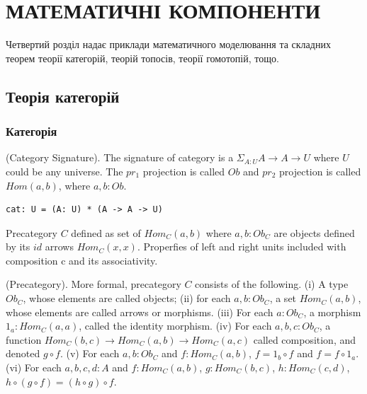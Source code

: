 \chapter{МАТЕМАТИЧНІ КОМПОНЕНТИ}

Четвертий розділ надає приклади математичного моделювання
та складних теорем теорії категорій, теорій топосів, теорії гомотопій, тощо.

\section{Теорія категорій}

\subsection{Категорія}

\begin{definition} (Category Signature).
The signature of category is
a $\Sigma_{A:U}A \rightarrow A \rightarrow U$ where $U$ could be any universe.
The $pr_1$ projection is called $Ob$ and $pr_2$ projection is
called $Hom(a,b)$, where $a,b:Ob$.
\begin{lstlisting}
cat: U = (A: U) * (A -> A -> U)
\end{lstlisting}
\end{definition}

Precategory $C$ defined as set of $Hom_C(a,b)$ where $a,b:Ob_C$
are objects defined by its $id$ arrows $Hom_C(x,x)$.
Properfies of left and right units included with composition c
and its associativity.

\begin{definition} (Precategory).
More formal, precategory $C$ consists of the following.
(i) A type $Ob_C$, whose elements are called objects;
(ii) for each $a,b: Ob_C$, a set $Hom_C(a,b)$, whose
elements are called arrows or morphisms.
(iii) For each $a: Ob_C$, a morphism $1_a : Hom_C(a,a)$,
called the identity morphism.
(iv) For each $a,b,c: Ob_C$, a function
$Hom_C(b,c) \rightarrow Hom_C(a,b) \rightarrow Hom_C(a,c)$
called composition, and denoted $g \circ f$.
(v) For each $a,b: Ob_C$ and $f: Hom_C(a,b)$,
$f = 1_b \circ f$ and $f = f \circ 1_a$.
(vi) For each $a,b,c,d: A$ and
$f: Hom_C(a,b)$, $g: Hom_C(b,c)$, $h: Hom_C(c,d)$,
$h \circ (g \circ f ) = (h \circ g) \circ f$.
\end{definition}


